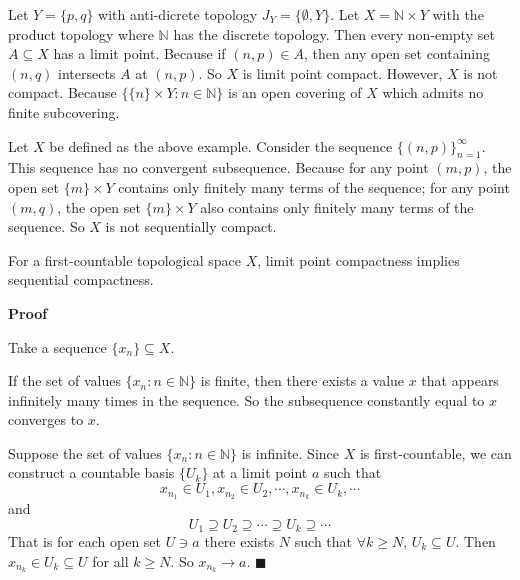 \documentclass[main.tex]{subfiles}
\begin{document}
\begin{example}
    Let $Y = \{p, q\}$ with anti-dicrete topology $J_Y = \{\emptyset, Y\}$. Let $X = \mathbb{N} \times Y$ with the product topology where $\mathbb{N}$ has the discrete topology. Then every non-empty set $A \subseteq X$ has a limit point. Because if $(n, p) \in A$, then any open set containing $(n, q)$ intersects $A$ at $(n, p)$. So $X$ is limit point compact. However, $X$ is not compact. Because $\{ \{n\} \times Y: n \in \mathbb{N} \}$ is an open covering of $X$ which admits no finite subcovering. 
\end{example}

\begin{example}
    Let $X$ be defined as the above example. Consider the sequence $\{(n, p)\}_{n=1}^{\infty}$. This sequence has no convergent subsequence. Because for any point $(m, p)$, the open set $\{m\} \times Y$ contains only finitely many terms of the sequence; for any point $(m, q)$, the open set $\{m\} \times Y$ also contains only finitely many terms of the sequence. So $X$ is not sequentially compact.
\end{example}

\begin{theorem}
    For a first-countable topological space $X$, limit point compactness implies sequential compactness.
\end{theorem}

\par \noindent \textbf{Proof} 
\par Take a sequence $\{x_n\} \subseteq X$. 
\par If the set of values $\{x_n: n \in \mathbb{N}\}$ is finite, then there exists a value $x$ that appears infinitely many times in the sequence. So the subsequence constantly equal to $x$ converges to $x$.
\par Suppose the set of values $\{x_n: n \in \mathbb{N}\}$ is infinite. Since $X$ is first-countable, we can construct a countable basis $\{U_k\}$ at a limit point $a$ such that 
\begin{equation}
    x_{n_1} \in U_1, x_{n_2} \in U_2, \cdots, x_{n_k} \in U_k, \cdots
\end{equation}
and 
\begin{equation}
    U_1 \supseteq U_2 \supseteq \cdots \supseteq U_k \supseteq \cdots
\end{equation}
That is for each open set $U \ni a$ there exists $N$ such that $\forall k \ge N$, $U_k \subseteq U$. Then $x_{n_k} \in U_k \subseteq U$ for all $k \ge N$. So $x_{n_k} \to a$. \hfill $\blacksquare$
\end{document}
